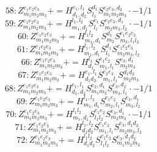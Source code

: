 \documentclass[letterpaper,10pt,fleqn,leqno,onecolumn]{article}
\begin{document}
\begin{equation} \;\;\;\;\;\;  58: Z^{e_{1}e_{2}e_{3}}_{m_{1}m_{2}m_{3}}+=H^{e_{1},l_{1}}_{d_{1},d_{2}}S^{d_{1}}_{l_{1}}S^{e_{2}e_{3},d_{2}}_{m_{1}m_{2}m_{3}}\cdot -1/1 \end{equation}
\begin{equation} \;\;\;\;\;\;  59: Z^{e_{1}e_{2}e_{3}}_{m_{1}m_{2}m_{3}}+=H^{l_{1},l_{2}}_{m_{1},d_{1}}S^{e_{1}}_{l_{1}}S^{e_{2}e_{3},d_{1}}_{m_{2}m_{3},l_{2}}\cdot -1/1 \end{equation}
\begin{equation} \;\;\;\;\;\;  60: Z^{e_{1}e_{2}e_{3}}_{m_{1}m_{2}m_{3}}+=H^{l_{1}l_{2}}_{m_{1},d_{1}}S^{d_{1}}_{m_{2}}S^{e_{1}e_{2}e_{3}}_{m_{3},l_{1}l_{2}} \end{equation}
\begin{equation} \;\;\;\;\;\;  61: Z^{e_{1}e_{2}e_{3}}_{m_{1}m_{2}m_{3}}+=H^{l_{1},l_{2}}_{m_{1},d_{1}}S^{d_{1}}_{l_{1}}S^{e_{1}e_{2}e_{3}}_{m_{2}m_{3},l_{2}} \end{equation}
\begin{equation} \;\;\;\;\;\;  66: Z^{e_{1}e_{2}e_{3}}_{m_{1}m_{2}m_{3}}+=H^{l_{1}}_{d_{1}}S^{e_{1}e_{2}}_{m_{1},l_{1}}S^{e_{3},d_{1}}_{m_{2}m_{3}} \end{equation}
\begin{equation} \;\;\;\;\;\;  67: Z^{e_{1}e_{2}e_{3}}_{m_{1}m_{2}m_{3}}+=H^{e_{1},l_{1}}_{d_{1}d_{2}}S^{e_{2}e_{3}}_{m_{1},l_{1}}S^{d_{1}d_{2}}_{m_{2}m_{3}} \end{equation}
\begin{equation} \;\;\;\;\;\;  68: Z^{e_{1}e_{2}e_{3}}_{m_{1}m_{2}m_{3}}+=H^{e_{1},l_{1}}_{d_{1},d_{2}}S^{e_{2},d_{1}}_{m_{1}m_{2}}S^{e_{3},d_{2}}_{m_{3},l_{1}}\cdot -1/1 \end{equation}
\begin{equation} \;\;\;\;\;\;  69: Z^{e_{1}e_{2}e_{3}}_{m_{1}m_{2}m_{3}}+=H^{l_{1},l_{2}}_{m_{1},d_{1}}S^{e_{1}e_{2}}_{m_{2},l_{1}}S^{e_{3},d_{1}}_{m_{3},l_{2}} \end{equation}
\begin{equation} \;\;\;\;\;\;  70: Z^{e_{1}e_{2}e_{3}}_{m_{1}m_{2}m_{3}}+=H^{l_{1}l_{2}}_{m_{1},d_{1}}S^{e_{1}e_{2}}_{l_{1}l_{2}}S^{e_{3},d_{1}}_{m_{2}m_{3}}\cdot -1/1 \end{equation}
\begin{equation} \;\;\;\;\;\;  71: Z^{e_{1}e_{2}e_{3}}_{m_{1}m_{2}m_{3}}+=H^{l_{1},l_{2}}_{d_{1}d_{2}}S^{e_{1}e_{2}}_{m_{1},l_{1}}S^{e_{3},d_{1}d_{2}}_{m_{2}m_{3},l_{2}} \end{equation}
\begin{equation} \;\;\;\;\;\;  72: Z^{e_{1}e_{2}e_{3}}_{m_{1}m_{2}m_{3}}+=H^{l_{1}l_{2}}_{d_{1}d_{2}}S^{e_{1}e_{2}}_{l_{1}l_{2}}S^{e_{3},d_{1}d_{2}}_{m_{1}m_{2}m_{3}} \end{equation}
\end{document}
